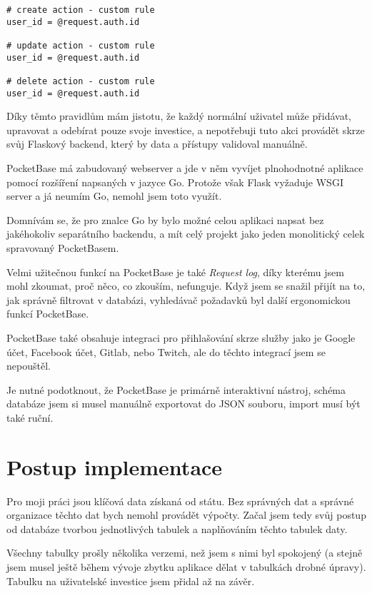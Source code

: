 \documentclass[11pt,a4paper,twoside,openright]{report}
\begin{document}
\begin{verbatim}
# create action - custom rule
user_id = @request.auth.id

# update action - custom rule
user_id = @request.auth.id

# delete action - custom rule
user_id = @request.auth.id
\end{verbatim}

Díky těmto pravidlům mám jistotu, že každý normální uživatel může přidávat, upravovat a odebírat pouze svoje
investice, a nepotřebuji tuto akci provádět skrze svůj Flaskový backend, který by data a přístupy validoval
manuálně.

PocketBase má zabudovaný webserver a jde v něm vyvíjet plnohodnotné aplikace pomocí rozšíření napsaných
v jazyce Go. Protože však Flask vyžaduje WSGI server a já neumím Go, nemohl jsem toto využít.

Domnívám se, že pro znalce Go by bylo možné celou aplikaci napsat bez jakéhokoliv separátního backendu,
a mít celý projekt jako jeden monolitický celek spravovaný PocketBasem.

Velmi užitečnou funkcí na PocketBase je také \emph{Request log}, díky kterému jsem mohl zkoumat, proč
něco, co zkouším, nefunguje. Když jsem se snažil přijít na to, jak správně filtrovat v databázi, vyhledávač
požadavků byl další ergonomickou funkcí PocketBase.

PocketBase také obsahuje integraci pro přihlašování skrze služby jako je Google účet, Facebook účet,
Gitlab, nebo Twitch, ale do těchto integrací jsem se nepouštěl.

Je nutné podotknout, že PocketBase je primárně interaktivní nástroj, schéma databáze jsem si musel
manuálně exportovat do JSON souboru, import musí být také ruční.

\section{Postup implementace}

Pro moji práci jsou klíčová data získaná od státu. Bez správných dat a správné organizace těchto dat
bych nemohl provádět výpočty. Začal jsem tedy svůj postup od databáze tvorbou jednotlivých tabulek
a naplňováním těchto tabulek daty.

Všechny tabulky prošly několika verzemi, než jsem s nimi byl spokojený (a stejně jsem musel ještě
během vývoje zbytku aplikace dělat v tabulkách drobné úpravy). Tabulku na uživatelské investice
jsem přidal až na závěr.
\end{document}
